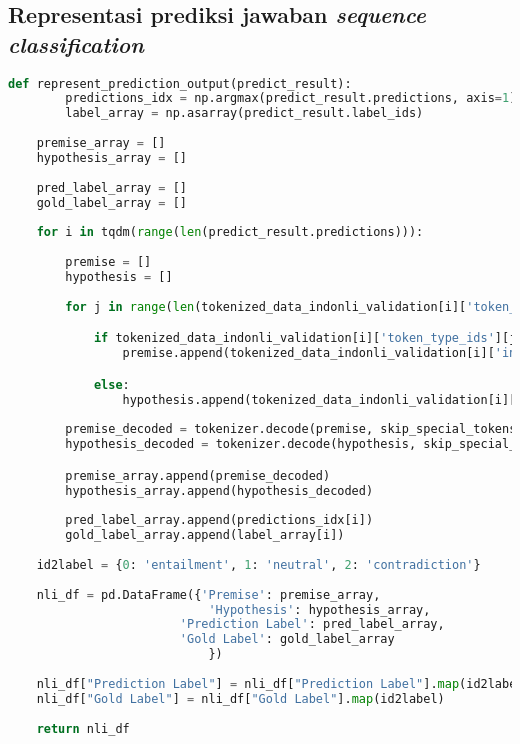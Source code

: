 \subsection{Representasi prediksi jawaban \emph{sequence classification}}
\begin{lstlisting}[language=Python, caption=Representasi prediksi jawaban \emph{sequence classification}]
def represent_prediction_output(predict_result):
        predictions_idx = np.argmax(predict_result.predictions, axis=1)
        label_array = np.asarray(predict_result.label_ids)
        
    premise_array = []
    hypothesis_array = []
    
    pred_label_array = []
    gold_label_array = []
    
    for i in tqdm(range(len(predict_result.predictions))):
        
        premise = []
        hypothesis = []
        
        for j in range(len(tokenized_data_indonli_validation[i]['token_type_ids'])):

            if tokenized_data_indonli_validation[i]['token_type_ids'][j] == 0:
                premise.append(tokenized_data_indonli_validation[i]['input_ids'][j])

            else:
                hypothesis.append(tokenized_data_indonli_validation[i]['input_ids'][j])
        
        premise_decoded = tokenizer.decode(premise, skip_special_tokens=True)
        hypothesis_decoded = tokenizer.decode(hypothesis, skip_special_tokens=True)

        premise_array.append(premise_decoded)
        hypothesis_array.append(hypothesis_decoded)
        
        pred_label_array.append(predictions_idx[i])
        gold_label_array.append(label_array[i])
        
    id2label = {0: 'entailment', 1: 'neutral', 2: 'contradiction'}
    
    nli_df = pd.DataFrame({'Premise': premise_array, 
                            'Hypothesis': hypothesis_array,
                        'Prediction Label': pred_label_array,
                        'Gold Label': gold_label_array
                            })
    
    nli_df["Prediction Label"] = nli_df["Prediction Label"].map(id2label)
    nli_df["Gold Label"] = nli_df["Gold Label"].map(id2label)
    
    return nli_df
\end{lstlisting}

